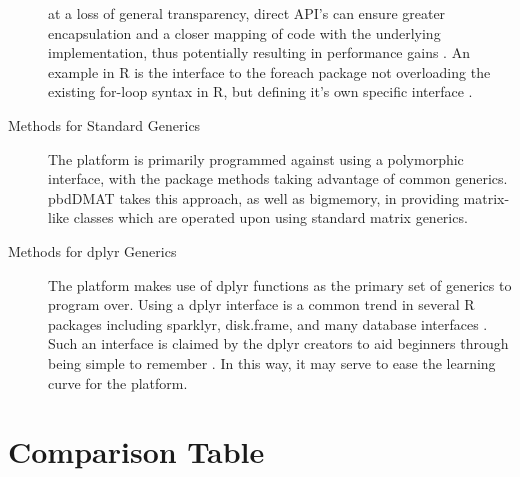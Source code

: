 \documentclass[a4paper,10pt]{article}
\begin{document}
\begin{description}
      at a loss of general transparency, direct API's can ensure
      greater encapsulation and a closer mapping of code with the
      underlying implementation, thus potentially resulting in
      performance gains \cite{bierhoff2009api}.
      An example in R is the interface to the foreach package not
      overloading the existing for-loop syntax in R, but defining it's
      own specific interface \cite{microsoft20}. 
\item[Methods for Standard Generics]
      The platform is primarily programmed against using a polymorphic
      interface, with the package methods taking advantage of common
      generics.
      pbdDMAT takes this approach, as well as bigmemory, in providing
      matrix-like classes which are operated upon using standard matrix
      generics\cite{pbdDMATpackage}\cite{kane13:bigmemory}.
\item[Methods for dplyr Generics]
      The platform makes use of dplyr functions as the primary set of
      generics to program over.
      Using a dplyr interface is a common trend in several R packages
      including sparklyr, disk.frame, and many database interfaces
      \cite{luraschi20}\cite{zj20}.
      Such an interface is claimed by the dplyr creators to aid
      beginners through being simple to remember \cite{wickham2019welcome}.
      In this way, it may serve to ease the learning curve for the platform.
\end{description}

\section{Comparison Table}\label{sec:comp-tab}
\end{document}
